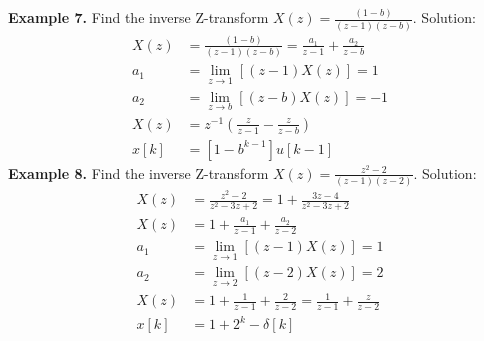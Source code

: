 \documentclass[twoside]{article}
\begin{document}
%
\textbf{Example 7.} Find the  inverse Z-transform $X(z) =
\frac{(1-b)}{(z-1) (z-b)}$. Solution:
%
\begin{align*}
    X(z) &= \frac{(1-b)}{(z-1) (z-b)} = \frac{a_1}{z-1} + 
                     \frac{a_2}{z-b} \\
    a_1 &= \lim_{z \to 1} \left[ (z - 1) X(z) \right] = 1 \\
    a_2 &= \lim_{z \to b} \left[ (z - b) X(z) \right] = -1 \\
   X(z) &= z^{-1} \left( \frac{z}{z-1} - \frac{z}{z-b} \right) \\
   x[k] &= [ 1 - b^{k-1} ] u[k-1]
\end{align*}
%
\textbf{Example 8.} Find the  inverse Z-transform $X(z) =
\frac{z^2 - 2}{(z-1) (z-2)}$. Solution:
%
\begin{align*}
X(z) &= \frac{z^2 - 2}{z^2 - 3 z + 2} = 1 + \frac{3z - 4}{z^2 - 3 z + 2}
\\
    X(z) &= 1 + \frac{a_1}{z-1} + \frac{a_2}{z-2} \\
    a_1 &= \lim_{z \to 1} \left[ (z -1) X(z) \right] = 1 \\
    a_2 &= \lim_{z \to 2} \left[ (z -2) X(z) \right] = 2 \\
   X(z) &= 1 +\frac{1}{z-1} + \frac{2}{z-2} = \frac{1}{z-1} +
          \frac{z}{z-2} \\
   x[k] &= 1 + 2^k - \delta[k] 
\end{align*}
%


\end{document}
